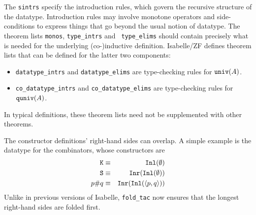 The {\tt sintrs} specify the introduction rules, which govern the recursive
structure of the datatype.  Introduction rules may involve monotone operators
and side-conditions to express things that go beyond the usual notion of
datatype.  The theorem lists {\tt monos}, {\tt type\_intrs} and {\tt
type\_elims} should contain precisely what is needed for the underlying
(co-)inductive definition.  Isabelle/ZF defines theorem lists that can be
defined for the latter two components:
\begin{itemize}
\item {\tt datatype\_intrs} and {\tt datatype\_elims} are type-checking rules
for ${\tt univ}(A)$.
\item {\tt co\_datatype\_intrs} and {\tt co\_datatype\_elims} are type-checking
rules for ${\tt quniv}(A)$.
\end{itemize}
In typical definitions, these theorem lists need not be supplemented with
other theorems.

The constructor definitions' right-hand sides can overlap.  A
simple example is the datatype for the combinators, whose constructors are 
\begin{eqnarray*}
  {\tt K} & \equiv & {\tt Inl}(\emptyset) \\
  {\tt S} & \equiv & {\tt Inr}({\tt Inl}(\emptyset)) \\
  p{\tt\#}q & \equiv & {\tt Inr}({\tt Inl}(\langle p,q\rangle)) 
\end{eqnarray*}
Unlike in previous versions of Isabelle, \verb|fold_tac| now ensures that the
longest right-hand sides are folded first.

\fi

